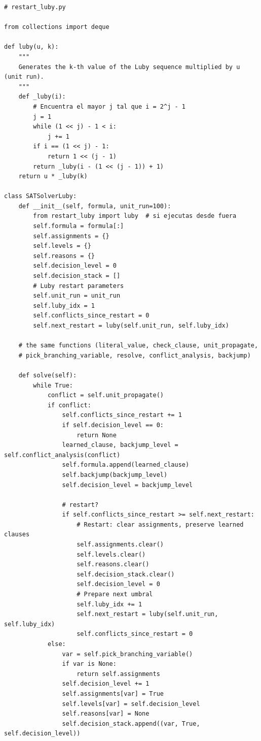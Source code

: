 \begin{lstlisting}
# restart_luby.py

from collections import deque

def luby(u, k):
    """
    Generates the k-th value of the Luby sequence multiplied by u (unit run).
    """
    def _luby(i):
        # Encuentra el mayor j tal que i = 2^j - 1
        j = 1
        while (1 << j) - 1 < i:
            j += 1
        if i == (1 << j) - 1:
            return 1 << (j - 1)
        return _luby(i - (1 << (j - 1)) + 1)
    return u * _luby(k)

class SATSolverLuby:
    def __init__(self, formula, unit_run=100):
        from restart_luby import luby  # si ejecutas desde fuera
        self.formula = formula[:]  
        self.assignments = {}
        self.levels = {}
        self.reasons = {}
        self.decision_level = 0
        self.decision_stack = []
        # Luby restart parameters
        self.unit_run = unit_run
        self.luby_idx = 1
        self.conflicts_since_restart = 0
        self.next_restart = luby(self.unit_run, self.luby_idx)

    # the same functions (literal_value, check_clause, unit_propagate,
    # pick_branching_variable, resolve, conflict_analysis, backjump)

    def solve(self):
        while True:
            conflict = self.unit_propagate()
            if conflict:
                self.conflicts_since_restart += 1
                if self.decision_level == 0:
                    return None
                learned_clause, backjump_level = self.conflict_analysis(conflict)
                self.formula.append(learned_clause)
                self.backjump(backjump_level)
                self.decision_level = backjump_level

                # restart?
                if self.conflicts_since_restart >= self.next_restart:
                    # Restart: clear assignments, preserve learned clauses
                    self.assignments.clear()
                    self.levels.clear()
                    self.reasons.clear()
                    self.decision_stack.clear()
                    self.decision_level = 0
                    # Prepare next umbral
                    self.luby_idx += 1
                    self.next_restart = luby(self.unit_run, self.luby_idx)
                    self.conflicts_since_restart = 0
            else:
                var = self.pick_branching_variable()
                if var is None:
                    return self.assignments
                self.decision_level += 1
                self.assignments[var] = True
                self.levels[var] = self.decision_level
                self.reasons[var] = None
                self.decision_stack.append((var, True, self.decision_level))
\end{lstlisting}

